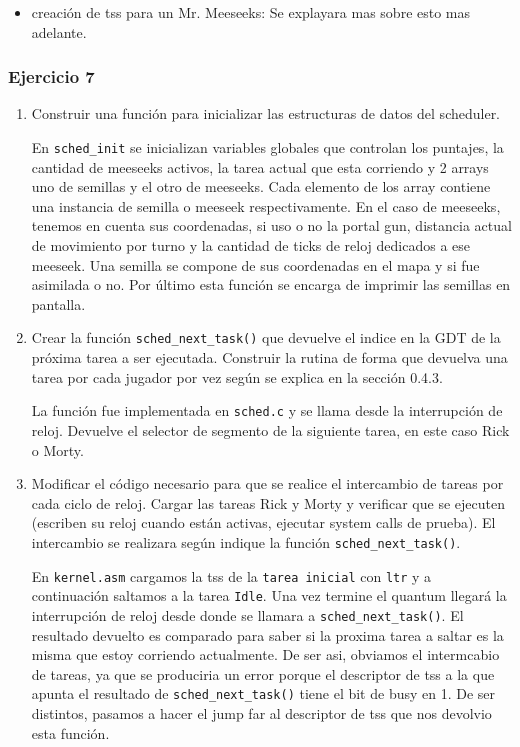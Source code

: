\documentclass[a4paper]{article}
\begin{document}
\begin{enumerate}[label=\alph*)]
\begin{itemize}
 		El con esp empezar\'a en la base de la nueva pagina libre que nos devuelve \texttt{mmu\_next\_free\_kernel\_page()}
 		\item creaci\'on de tss para un Mr. Meeseeks: Se explayara mas sobre esto mas adelante. 
 	\end{itemize}
 
 \end{enumerate}
 
\subsubsection{Ejercicio 7}

\begin{enumerate}[label=\alph*)]
	\item Construir una función para inicializar las estructuras de datos del scheduler.
	
	En \texttt{sched\_init} se inicializan variables globales que controlan los puntajes, la cantidad de meeseeks activos, la tarea actual que esta corriendo y 2 arrays uno de semillas y el otro de meeseeks. Cada elemento de los array contiene una instancia de semilla o meeseek respectivamente. En el caso de meeseeks, tenemos en cuenta sus coordenadas, si uso o no la portal gun, distancia actual de movimiento por turno y la cantidad de ticks de reloj dedicados a ese meeseek. Una semilla se compone de sus coordenadas en el mapa y si fue asimilada o no. Por \'ultimo esta funci\'on se encarga de imprimir las semillas en pantalla.
	
	\item Crear la función \texttt{sched\_next\_task()} que devuelve el indice en la GDT de la próxima tarea a ser ejecutada. Construir la rutina de forma que devuelva una tarea por cada jugador por vez según se explica en la sección 0.4.3.
	
	La funci\'on fue implementada en \texttt{sched.c} y se llama desde la interrupción de reloj. Devuelve el selector de segmento de la siguiente tarea, en este caso Rick o Morty.
	    
	\item Modificar el código necesario para que se realice el intercambio de tareas por cada ciclo de reloj. Cargar las tareas Rick y Morty y verificar que se ejecuten (escriben su reloj cuando están activas, ejecutar system calls de prueba). El intercambio se realizara según indique la función \texttt{sched\_next\_task()}.
	
	En \texttt{kernel.asm} cargamos la tss de la \texttt{tarea inicial} con \texttt{ltr} y a continuaci\'on saltamos a la tarea \texttt{Idle}. Una vez termine el quantum llegar\'a la interrupción de reloj desde donde se llamara a \texttt{sched\_next\_task()}. El resultado devuelto es comparado para saber si la proxima tarea a saltar es la misma que estoy corriendo actualmente. De ser asi, obviamos el intermcabio de tareas, ya que se produciria un error porque el descriptor de tss a la que apunta el resultado de \texttt{sched\_next\_task()} tiene el bit de busy en 1. De ser distintos, pasamos a hacer el jump far al descriptor de tss que nos devolvio esta funci\'on.
	

\end{enumerate}
\end{document}
